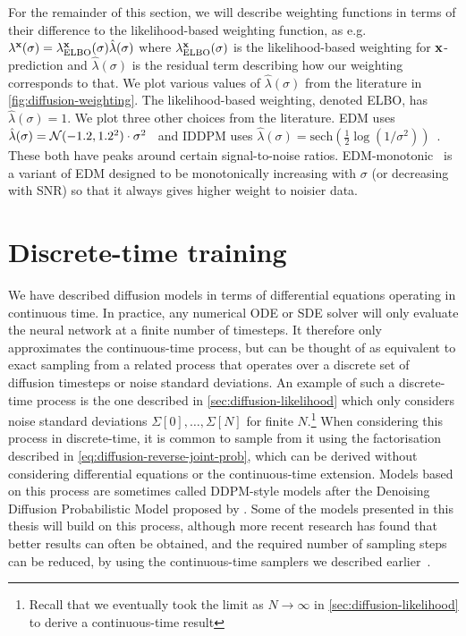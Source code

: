 For the remainder of this section, we will describe weighting functions in terms of their difference to the likelihood-based weighting function, as e.g. $\lambda^{\mathbf{x}}(\sigma) = \lambda^{\mathbf{x}}_\text{ELBO}(\sigma) \hat{\lambda}(\sigma)$ where $\lambda^{\mathbf{x}}_\text{ELBO}(\sigma)$ is the likelihood-based weighting for ${\mathbf{x}}$-prediction and $\hat{\lambda}(\sigma)$ is the residual term describing how our weighting corresponds to that. We plot various values of $\hat{\lambda}(\sigma)$ from the literature in \cref{fig:diffusion-weighting}. The likelihood-based weighting, denoted ELBO, has $\hat{\lambda}(\sigma) = 1$. We plot three other choices from the literature. EDM uses $\hat{\lambda}(\sigma) = {\mathcal{N}}(-1.2, 1.2^2) \cdot \sigma^2$~\citep{karras2022elucidating,kingma2023understanding} and IDDPM uses $\hat{\lambda}(\sigma) = \text{sech}(\frac{1}{2} \log(1/\sigma^2) )$~\citep{nichol2021improved,kingma2023understanding}. These both have peaks around certain signal-to-noise ratios. EDM-monotonic~\citep{kingma2023understanding} is a variant of EDM designed to be monotonically increasing with $\sigma$ (or decreasing with SNR) so that it always gives higher weight to noisier data.


\section{Discrete-time training} \label{sec:diffusion-discrete-time}
We have described diffusion models in terms of differential equations operating in continuous time. In practice, any numerical ODE or SDE solver will only evaluate the neural network at a finite number of timesteps. It therefore only approximates the continuous-time process, but can be thought of as equivalent to exact sampling from a related process that operates over a discrete set of diffusion timesteps or noise standard deviations. An example of such a discrete-time process is the one described in \cref{sec:diffusion-likelihood} which only considers noise standard deviations $\Sigma[0], \ldots, \Sigma[N]$ for finite $N$.\footnote{Recall that we eventually took the limit as $N \rightarrow \infty$ in \cref{sec:diffusion-likelihood} to derive a continuous-time result} When considering this process in discrete-time, it is common to sample from it using the factorisation described in \cref{eq:diffusion-reverse-joint-prob}, which can be derived without considering differential equations or the continuous-time extension. Models based on this process are sometimes called DDPM-style models after the Denoising Diffusion Probabilistic Model proposed by \citet{ho2020denoising}. Some of the models presented in this thesis will build on this process, although more recent research has found that better results can often be obtained, and the required number of sampling steps can be reduced, by using the continuous-time samplers we described earlier~\citep{karras2022elucidating}. 

